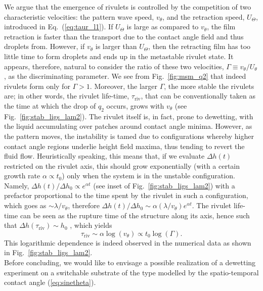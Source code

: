 We argue that the emergence of rivulets is controlled by the competition of two characteristic velocities: the pattern wave speed, $v_{\theta}$, and the retraction speed, $U_{\Theta}$, introduced in Eq.~(\ref{eq:taur_l1}). 
If $U_{\Theta}$ is large as compared to $v_{\theta}$, the film retraction is faster than the transport due to the contact angle field and thus droplets from.
However, if $v_{\theta}$ is larger than $U_{\Theta}$, then the retracting film has too little time to form droplets and ends up in the metastable rivulet state. 
It appears, therefore, natural to consider the ratio of these two velocities, 
$\Gamma \equiv v_{\theta}/U_{\theta}$, as the discriminating parameter.
We see from Fig.~\ref{fig:msm_q2} that indeed rivulets form only for $\Gamma > 1$. 
Moreover, the larger $\Gamma$, the more stable the rivulets are; in other words, the rivulet life-time, $\tau_{\text{riv}}$, that can be conventionally taken as the time at which the drop of $q_2$ occurs, grows with $v_{\theta}$ (see Fig.~\ref{fig:stab_ligs_lam2}).
The rivulet itself is, in fact, prone to dewetting, with the liquid accumulating over patches around contact angle minima. 
However, as the pattern moves, the instability is tamed due to configurations whereby higher contact angle regions underlie height field maxima, thus tending to revert the fluid flow.
Heuristically speaking, this means that, if we evaluate $\Delta h(t)$ restricted on the rivulet axis, this should grow exponentially (with a certain growth rate $\alpha \propto t_0$) only when the system is in the unstable configuration. 
Namely, $\Delta h(t)/\Delta h_0 \propto e^{\alpha t}$ (see inset of Fig.~\ref{fig:stab_ligs_lam2}) with a prefactor proportional to the time spent by the rivulet in such a configuration, which goes as $\sim \lambda/v_{\theta}$, therefore $\Delta h(t)/\Delta h_0 \sim \alpha (\lambda/v_{\theta})e^{\alpha t}$. 
The rivulet life-time can be seen as the rupture time of the structure along its axis, hence such that $\Delta h (\tau_{\text{riv}}) \sim h_0$ \cite{zitzLatticeBoltzmannSimulations2021}, which yields
\begin{equation}\label{eq:rivlt}
    \tau_{\text{riv}} \sim \alpha \log(v_{\theta}) \propto t_0 \log(\Gamma). 
\end{equation}
This logarithmic dependence is indeed observed in the numerical data as shown in Fig.~\ref{fig:stab_ligs_lam2}.\\
Before concluding, we would like to envisage a possible realization of a dewetting experiment on a switchable substrate of the type modelled by the spatio-temporal contact angle (\ref{eq:sinetheta}). 
